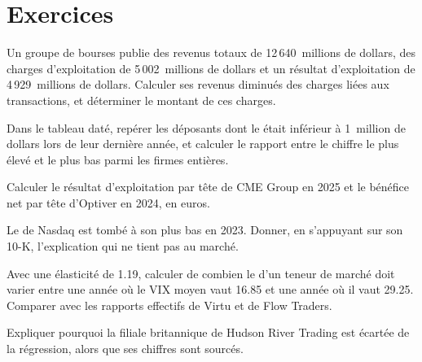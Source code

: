 \section{Exercices}

\begin{exercise}[$\star$]\label{exo:in:revenue-and-profit-across-the-industry:1}
Un groupe de bourses publie des revenus totaux de 12\,640~millions de dollars, des charges d'exploitation de 5\,002~millions de dollars et un
résultat d'exploitation de 4\,929~millions de dollars. Calculer ses revenus diminués des charges liées aux transactions, et déterminer le montant de ces charges.
\end{exercise}

\begin{exercise}[$\star$]\label{exo:in:revenue-and-profit-across-the-industry:2}
Dans le tableau daté, repérer les déposants dont le  était inférieur à 1~million de dollars lors de leur dernière année, et calculer
le rapport entre le chiffre le plus élevé et le plus bas parmi les firmes entières.
\end{exercise}

\begin{exercise}[$\star$]\label{exo:in:revenue-and-profit-across-the-industry:3}
Calculer le résultat d'exploitation par tête de CME Group en 2025 et le bénéfice net par tête d'Optiver en 2024, en euros.
\end{exercise}

\begin{exercise}[$\star\star$]\label{exo:in:revenue-and-profit-across-the-industry:4}
Le  de Nasdaq est tombé à son plus bas en 2023. Donner, en s'appuyant sur son 10-K, l'explication qui ne tient pas au marché.
\end{exercise}

\begin{exercise}[$\star\star$]\label{exo:in:revenue-and-profit-across-the-industry:5}
Avec une élasticité de 1.19, calculer de combien le  d'un teneur de marché doit varier entre une année où le VIX moyen
vaut 16.85 et une année où il vaut 29.25. Comparer avec les rapports effectifs de Virtu et de Flow Traders.
\end{exercise}

\begin{exercise}[$\star\star$]\label{exo:in:revenue-and-profit-across-the-industry:6}
Expliquer pourquoi la filiale britannique de Hudson River Trading est écartée de la régression, alors que ses chiffres sont sourcés.
\end{exercise}

